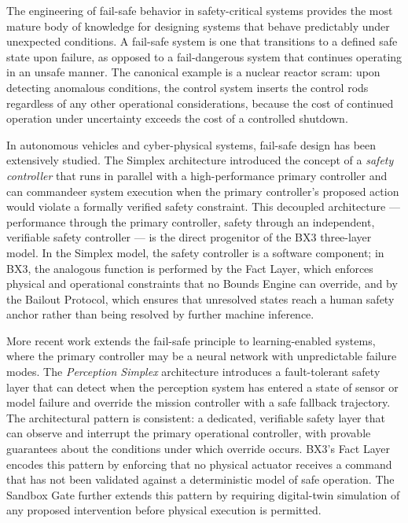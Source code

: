 The engineering of fail-safe behavior in safety-critical systems provides the most mature body of knowledge for designing systems that behave predictably under unexpected conditions. A fail-safe system is one that transitions to a defined safe state upon failure, as opposed to a fail-dangerous system that continues operating in an unsafe manner. The canonical example is a nuclear reactor scram: upon detecting anomalous conditions, the control system inserts the control rods regardless of any other operational considerations, because the cost of continued operation under uncertainty exceeds the cost of a controlled shutdown.

In autonomous vehicles and cyber-physical systems, fail-safe design has been extensively studied. The Simplex architecture \cite{bansal2019} introduced the concept of a \textit{safety controller} that runs in parallel with a high-performance primary controller and can commandeer system execution when the primary controller's proposed action would violate a formally verified safety constraint. This decoupled architecture --- performance through the primary controller, safety through an independent, verifiable safety controller --- is the direct progenitor of the BX3 three-layer model. In the Simplex model, the safety controller is a software component; in BX3, the analogous function is performed by the Fact Layer, which enforces physical and operational constraints that no Bounds Engine can override, and by the Bailout Protocol, which ensures that unresolved states reach a human safety anchor rather than being resolved by further machine inference.

More recent work \cite{bansal2019} extends the fail-safe principle to learning-enabled systems, where the primary controller may be a neural network with unpredictable failure modes. The \textit{Perception Simplex} architecture introduces a fault-tolerant safety layer that can detect when the perception system has entered a state of sensor or model failure and override the mission controller with a safe fallback trajectory. The architectural pattern is consistent: a dedicated, verifiable safety layer that can observe and interrupt the primary operational controller, with provable guarantees about the conditions under which override occurs. BX3's Fact Layer encodes this pattern by enforcing that no physical actuator receives a command that has not been validated against a deterministic model of safe operation. The Sandbox Gate further extends this pattern by requiring digital-twin simulation of any proposed intervention before physical execution is permitted.

